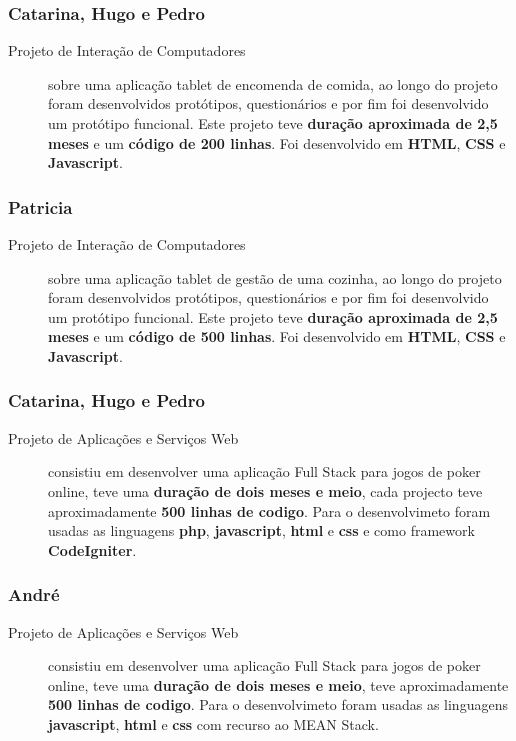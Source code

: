 \documentclass[a4paper]{report}
\begin{document}
\subsubsection*{Catarina, Hugo e Pedro} 
\begin{description}
    \item[Projeto de Interação de Computadores] sobre uma aplicação tablet de encomenda de comida, ao longo do projeto foram desenvolvidos protótipos, questionários e por fim foi desenvolvido um protótipo funcional. Este projeto teve \textbf{duração aproximada de 2,5 meses} e um \textbf{código de 200 linhas}. Foi desenvolvido em \textbf{HTML}, \textbf{CSS} e \textbf{Javascript}.
\end{description}

\subsubsection*{Patricia} 
\begin{description}
    \item[Projeto de Interação de Computadores] sobre uma aplicação tablet de gestão de uma cozinha, ao longo do projeto foram desenvolvidos protótipos, questionários e por fim foi desenvolvido um protótipo funcional. Este projeto teve \textbf{duração aproximada de 2,5 meses} e um \textbf{código de 500 linhas}. Foi desenvolvido em \textbf{HTML}, \textbf{CSS} e \textbf{Javascript}.
\end{description}

\subsubsection*{Catarina, Hugo e Pedro}
\begin{description}
    \item[Projeto de Aplicações e Serviços Web] consistiu em desenvolver uma aplicação Full Stack para jogos de poker online, teve uma \textbf{duração de dois meses e meio}, cada projecto teve aproximadamente \textbf{500 linhas de codigo}. Para o desenvolvimeto foram usadas as linguagens \textbf{php}, \textbf{javascript}, \textbf{html} e \textbf{css} e como framework \textbf{CodeIgniter}.
\end{description}

\subsubsection*{André}
\begin{description}
    \item[Projeto de Aplicações e Serviços Web] consistiu em desenvolver uma aplicação Full Stack para jogos de poker online, teve uma \textbf{duração de dois meses e meio}, teve aproximadamente \textbf{500 linhas de codigo}. Para o desenvolvimeto foram usadas as linguagens \textbf{javascript}, \textbf{html} e \textbf{css} com recurso ao MEAN Stack.
\end{description}
\end{document}
